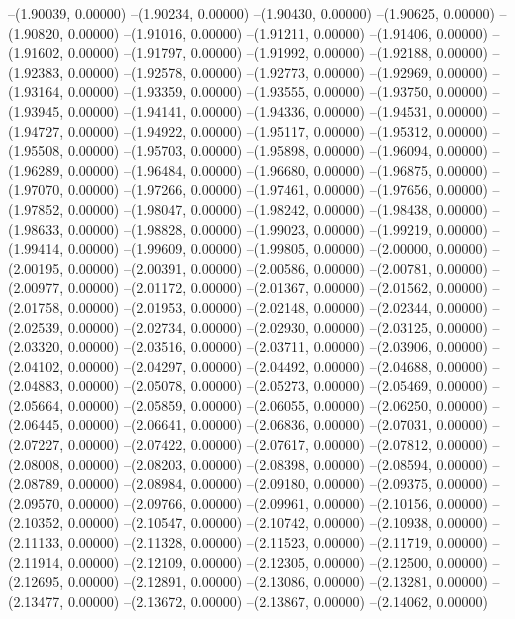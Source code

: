 --(1.90039, 0.00000)
--(1.90234, 0.00000)
--(1.90430, 0.00000)
--(1.90625, 0.00000)
--(1.90820, 0.00000)
--(1.91016, 0.00000)
--(1.91211, 0.00000)
--(1.91406, 0.00000)
--(1.91602, 0.00000)
--(1.91797, 0.00000)
--(1.91992, 0.00000)
--(1.92188, 0.00000)
--(1.92383, 0.00000)
--(1.92578, 0.00000)
--(1.92773, 0.00000)
--(1.92969, 0.00000)
--(1.93164, 0.00000)
--(1.93359, 0.00000)
--(1.93555, 0.00000)
--(1.93750, 0.00000)
--(1.93945, 0.00000)
--(1.94141, 0.00000)
--(1.94336, 0.00000)
--(1.94531, 0.00000)
--(1.94727, 0.00000)
--(1.94922, 0.00000)
--(1.95117, 0.00000)
--(1.95312, 0.00000)
--(1.95508, 0.00000)
--(1.95703, 0.00000)
--(1.95898, 0.00000)
--(1.96094, 0.00000)
--(1.96289, 0.00000)
--(1.96484, 0.00000)
--(1.96680, 0.00000)
--(1.96875, 0.00000)
--(1.97070, 0.00000)
--(1.97266, 0.00000)
--(1.97461, 0.00000)
--(1.97656, 0.00000)
--(1.97852, 0.00000)
--(1.98047, 0.00000)
--(1.98242, 0.00000)
--(1.98438, 0.00000)
--(1.98633, 0.00000)
--(1.98828, 0.00000)
--(1.99023, 0.00000)
--(1.99219, 0.00000)
--(1.99414, 0.00000)
--(1.99609, 0.00000)
--(1.99805, 0.00000)
--(2.00000, 0.00000)
--(2.00195, 0.00000)
--(2.00391, 0.00000)
--(2.00586, 0.00000)
--(2.00781, 0.00000)
--(2.00977, 0.00000)
--(2.01172, 0.00000)
--(2.01367, 0.00000)
--(2.01562, 0.00000)
--(2.01758, 0.00000)
--(2.01953, 0.00000)
--(2.02148, 0.00000)
--(2.02344, 0.00000)
--(2.02539, 0.00000)
--(2.02734, 0.00000)
--(2.02930, 0.00000)
--(2.03125, 0.00000)
--(2.03320, 0.00000)
--(2.03516, 0.00000)
--(2.03711, 0.00000)
--(2.03906, 0.00000)
--(2.04102, 0.00000)
--(2.04297, 0.00000)
--(2.04492, 0.00000)
--(2.04688, 0.00000)
--(2.04883, 0.00000)
--(2.05078, 0.00000)
--(2.05273, 0.00000)
--(2.05469, 0.00000)
--(2.05664, 0.00000)
--(2.05859, 0.00000)
--(2.06055, 0.00000)
--(2.06250, 0.00000)
--(2.06445, 0.00000)
--(2.06641, 0.00000)
--(2.06836, 0.00000)
--(2.07031, 0.00000)
--(2.07227, 0.00000)
--(2.07422, 0.00000)
--(2.07617, 0.00000)
--(2.07812, 0.00000)
--(2.08008, 0.00000)
--(2.08203, 0.00000)
--(2.08398, 0.00000)
--(2.08594, 0.00000)
--(2.08789, 0.00000)
--(2.08984, 0.00000)
--(2.09180, 0.00000)
--(2.09375, 0.00000)
--(2.09570, 0.00000)
--(2.09766, 0.00000)
--(2.09961, 0.00000)
--(2.10156, 0.00000)
--(2.10352, 0.00000)
--(2.10547, 0.00000)
--(2.10742, 0.00000)
--(2.10938, 0.00000)
--(2.11133, 0.00000)
--(2.11328, 0.00000)
--(2.11523, 0.00000)
--(2.11719, 0.00000)
--(2.11914, 0.00000)
--(2.12109, 0.00000)
--(2.12305, 0.00000)
--(2.12500, 0.00000)
--(2.12695, 0.00000)
--(2.12891, 0.00000)
--(2.13086, 0.00000)
--(2.13281, 0.00000)
--(2.13477, 0.00000)
--(2.13672, 0.00000)
--(2.13867, 0.00000)
--(2.14062, 0.00000)
